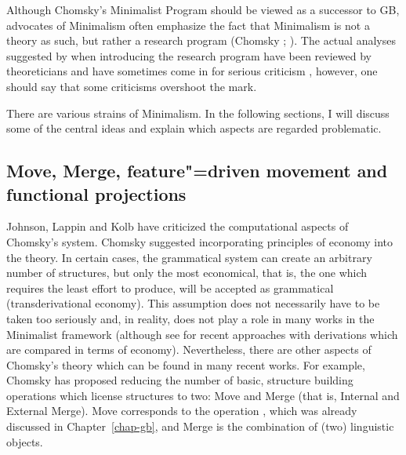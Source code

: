 Although Chomsky's Minimalist Program should be viewed as a successor to GB, advocates of Minimalism often emphasize the fact that Minimalism is not
a theory as such, but rather a research program (Chomsky \citeyear[]{Chomsky2007a};
\citeyear[]{Chomsky2013a}). The actual analyses suggested by \citet{Chomsky95a-u} when introducing the research program have been reviewed by theoreticians and have sometimes come in for serious criticism
\citep*{Kolb97a,JL97a-u-platte,JL99a-u,LLJ2000b,LLJ2000a,LLJ2001a,Seuren2004a,PJ2005a},
however, one should say that some criticisms overshoot the mark.

There are various strains of Minimalism. In the following sections, I will discuss some of the
central ideas and explain which aspects are regarded problematic.

\subsection{Move, Merge, feature"=driven movement and functional projections}
\label{Abschnitt-merkmalsgetriebene-Bewegung}
\label{Abschnitt-MP-funktionale-Projektionen}\label{sec-functional-projections-minimalism}
\label{Abschnitt-Kaynesche-Modelle}

Johnson, Lappin and Kolb have criticized the computational aspects of Chomsky's system. Chomsky suggested incorporating principles of economy into
the theory. In certain cases, the grammatical system can create an arbitrary number of structures, but only the most economical, that is, the one which
requires the least effort to produce, will be accepted as grammatical (transderivational economy). This assumption
does not necessarily have to be taken too seriously and, in reality, does not play a role in many works in the Minimalist framework (although see
\citet{Richards2015a} for recent approaches with derivations which are compared in terms of economy). Nevertheless, there are other aspects of 
Chomsky's theory which can be found in many recent works. For example, Chomsky has proposed reducing
the number of basic, structure building operations which license structures to two: Move and Merge (that is, Internal and External Merge).
Move corresponds to the operation \movea, which was already discussed in Chapter~\ref{chap-gb}, and
Merge is the combination of (two) linguistic objects.


